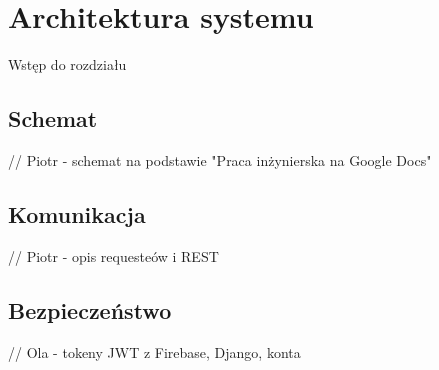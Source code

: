 \chapter{Architektura systemu}

Wstęp do rozdziału

\section*{Schemat}

// Piotr - schemat na podstawie "Praca inżynierska na Google Docs"

\section*{Komunikacja}

// Piotr - opis requesteów i REST

\section*{Bezpieczeństwo}

// Ola - tokeny JWT z Firebase, Django, konta